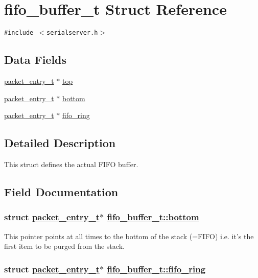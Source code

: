 \hypertarget{structfifo__buffer__t}{
\section{fifo\_\-buffer\_\-t Struct Reference}
\label{structfifo__buffer__t}
}
{\tt \#include $<$serialserver.h$>$}

\subsection*{Data Fields}
\begin{CompactItemize}
\item 
\hyperlink{structpacket__entry__t}{packet\_\-entry\_\-t} $\ast$ \hyperlink{structfifo__buffer__t_5daee039d39228d2a6346711d6d07bf4}{top}
\item 
\hyperlink{structpacket__entry__t}{packet\_\-entry\_\-t} $\ast$ \hyperlink{structfifo__buffer__t_423e4348f2849bd7d99d96d2df10efec}{bottom}
\item 
\hyperlink{structpacket__entry__t}{packet\_\-entry\_\-t} $\ast$ \hyperlink{structfifo__buffer__t_572f410339929c934f4c89e2e1a90b76}{fifo\_\-ring}
\end{CompactItemize}


\subsection{Detailed Description}
This struct defines the actual FIFO buffer. 



\subsection{Field Documentation}
\hypertarget{structfifo__buffer__t_423e4348f2849bd7d99d96d2df10efec}{
\subsubsection[bottom]{\setlength{\rightskip}{0pt plus 5cm}struct \hyperlink{structpacket__entry__t}{packet\_\-entry\_\-t}$\ast$ \hyperlink{structfifo__buffer__t_423e4348f2849bd7d99d96d2df10efec}{fifo\_\-buffer\_\-t::bottom}}}
\label{structfifo__buffer__t_423e4348f2849bd7d99d96d2df10efec}


This pointer points at all times to the bottom of the stack (=FIFO) i.e. it's the first item to be purged from the stack. \hypertarget{structfifo__buffer__t_572f410339929c934f4c89e2e1a90b76}{
\subsubsection[fifo\_\-ring]{\setlength{\rightskip}{0pt plus 5cm}struct \hyperlink{structpacket__entry__t}{packet\_\-entry\_\-t}$\ast$ \hyperlink{structfifo__buffer__t_572f410339929c934f4c89e2e1a90b76}{fifo\_\-buffer\_\-t::fifo\_\-ring}}}
\label{structfifo__buffer__t_572f410339929c934f4c89e2e1a90b76}


